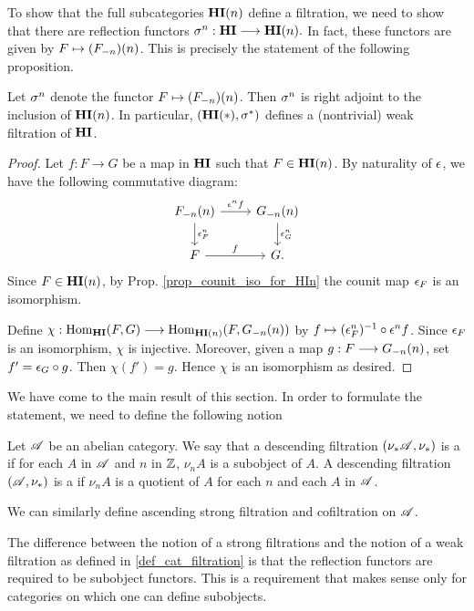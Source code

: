 To show that the full subcategories $\LHI[n]{\HI}$ define a 
filtration, we need to show that there are reflection functors
$\sgHI{n}: \HI \to \LHI[n]{\HI}.$ In fact, these functors are 
given by $F \mapsto \LHI[n]{(\RHI[n]{F})}$. This is precisely
the statement of the following proposition.

\begin{prop}\label{prop_HI_upper_slice}
Let $\sgHI{n}$ denote the functor $F \mapsto 
\LHI[n]{(\RHI[n]{F})}$. Then $\sgHI{n}$ is right adjoint to the 
inclusion of $\LHI[n]{\HI}$. In particular, $(\LHI[*]{\HI}, 
\sgHI{*})$ defines a (nontrivial) weak filtration of $\HI$.
\end{prop}
\begin{proof}
Let $f: F \to G$ be a map in $\HI$ such that $F \in \LHI[n]{\HI}$.
By naturality of $\cuHI$, we have the following commutative 
diagram:
\[
\begin{tikzcd}
\LHI[n]{\RHI[n]{F}} \arrow{r}{\cuHI^n f}\arrow{d}{\cuHI^n_F} 
& \LHI[n]{\RHI[n]{G}} \arrow{d}{\cuHI^n_G} \\
F \arrow{r}{f}
& G.
\end{tikzcd}
\]
Since $F \in \LHI[n]{\HI}$, by Prop. \ref{prop_counit_iso_for_HIn} 
the counit map $\cuHI_F$ is an isomorphism.

Define $\chi: \homHI(F, G) \to \hom_{\LHI[n]{\HI}}(F, 
\LHI[n]{\RHI[n]{G}})$ by $f \mapsto (\cuHI^n_F)^{-1} \comp \cuHI^n 
f$. Since $\cuHI_F$ is an isomorphism, $\chi$ is injective. 
Moreover, given a map $g: F \to \LHI[n]{\RHI[n]{G}}$, set $f' = 
\cuHI_G \comp g$. Then $\chi(f') = g$. Hence $\chi$ is an 
isomorphism as desired.
\end{proof}

We have come to the main result of this section. In order to 
formulate the statement, we need to define the following notion

\begin{defn}\label{def_strong_filtration}
Let $\Cat{A}$ be an abelian category. We say that a descending 
filtration $(\nu_*\Cat{A}, \nu_*)$ is a  if 
for each $A$ in $\Cat{A}$ and $n$ in $\Z$, $\nu_n A$ is a 
subobject of $A$. A descending filtration $(\Cat{A}, \nu_*)$ 
is a  if $\nu_n A$ is a quotient of 
$A$ for each $n$ and each $A$ in $\Cat{A}$.

We can similarly define ascending strong filtration and 
cofiltration on $\Cat{A}$.
\end{defn}

\begin{rmk}
The difference between the notion of a strong filtrations and 
the notion of a weak filtration as defined in 
\ref{def_cat_filtration} is that the reflection functors  are
required to be subobject functors. This is a requirement that
makes sense only for categories on which one can define
subobjects.
\end{rmk}


